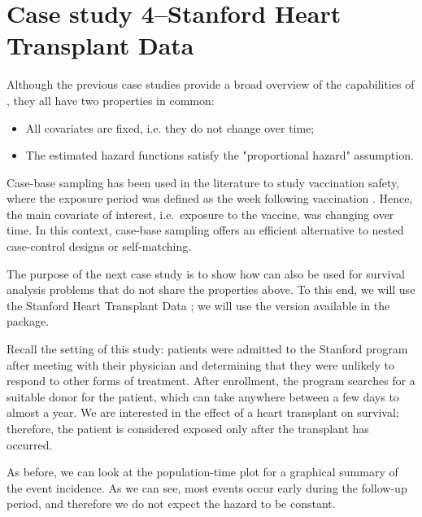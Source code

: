 \documentclass[
]{jss}
\begin{document}
\hypertarget{case-study-4stanford-heart-transplant-data}{%
\section{Case study 4--Stanford Heart Transplant
Data}\label{case-study-4stanford-heart-transplant-data}}

Although the previous case studies provide a broad overview of the
capabilities of , they all have two properties in common:

\begin{itemize}
  \item All covariates are fixed, i.e. they do not change over time;
  \item The estimated hazard functions satisfy the "proportional hazard" assumption.
\end{itemize}

Case-base sampling has been used in the literature to study vaccination
safety, where the exposure period was defined as the week following
vaccination \citep{saarela2015case}. Hence, the main covariate of
interest, i.e.~exposure to the vaccine, was changing over time. In this
context, case-base sampling offers an efficient alternative to nested
case-control designs or self-matching.

The purpose of the next case study is to show how  can
also be used for survival analysis problems that do not share the
properties above. To this end, we will use the Stanford Heart Transplant
Data \citep[\citet{crowley1977covariance}]{clark1971cardiac}; we will
use the version available in the  package.

Recall the setting of this study: patients were admitted to the Stanford
program after meeting with their physician and determining that they
were unlikely to respond to other forms of treatment. After enrollment,
the program searches for a suitable donor for the patient, which can
take anywhere between a few days to almost a year. We are interested in
the effect of a heart transplant on survival; therefore, the patient is
considered exposed only after the transplant has occurred.

As before, we can look at the population-time plot for a graphical
summary of the event incidence. As we can see, most events occur early
during the follow-up period, and therefore we do not expect the hazard
to be constant.
\end{document}
